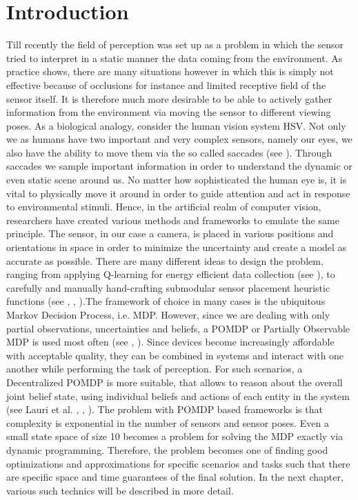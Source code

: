 \documentclass[12pt,twoside]{article}
\theoremstyle{plain}
\theoremstyle{definition}
\theoremstyle{remark}
\begin{document}
\section{Introduction}
\label{sec:introduction}
Till recently the field of perception was set up as a problem in which the sensor tried to interpret in a static manner the data coming from the environment. As practice shows, there are many situations however in which this is simply not effective because of occlusions for instance and limited receptive field of the sensor itself. It is therefore much more desirable to be able to actively gather information from the environment via moving the sensor to different viewing poses. As a biological analogy, consider the human vision system HSV. Not only we as humans have two important and very complex sensors, namely our eyes, we also have the ability to move them via the so called saccades (see \cite{rolfs2015attention}). Through saccades we sample important information in order to understand the dynamic or even static scene around us. No matter how sophisticated the human eye is, it is vital to physically move it around in order to guide attention and act in response to environmental stimuli.
Hence, in the artificial realm of computer vision, researchers have created various methods and frameworks to emulate the same principle. The sensor, in our case a camera, is placed in various positions and orientations in space in order to minimize the uncertainty and create a model as accurate as possible. There are many different ideas to design the problem, ranging from applying Q-learning for energy efficient data collection (see \cite{di2010adaptive}), to carefully and manually hand-crafting submodular sensor placement heuristic functions (see \cite{nemhauser1978analysis}, \cite{feige1998threshold}, \cite{golovin2011adaptive}).The framework of choice in many cases is the ubiquitous Markov Decision Process, i.e. MDP. However, since we are dealing with only partial observations, uncertainties and beliefs, a POMDP or Partially Observable MDP is used most often (see \cite{eidenberger2010active}, \cite{sridharan2010planning}). Since devices become increasingly affordable with acceptable quality, they can be combined in systems and interact with one another while performing the task of perception. For such scenarios, a Decentralized POMDP is more suitable, that allows to reason about the overall joint belief state, using individual beliefs and actions of each entity in the system (see Lauri et al. \cite{lauri2017multi}, \cite{lauri2019information}, \cite{oliehoek2016concise}). The problem with POMDP based frameworks is that complexity is exponential in the number of sensors and sensor poses. Even a small state space of size 10 becomes a problem for solving the MDP exactly via dynamic programming. Therefore, the problem becomes one of finding good optimizations and approximations for specific scenarios and tasks such that there are specific space and time guarantees of the final solution. In the next chapter, various such technics will be described in more detail.
\end{document}
